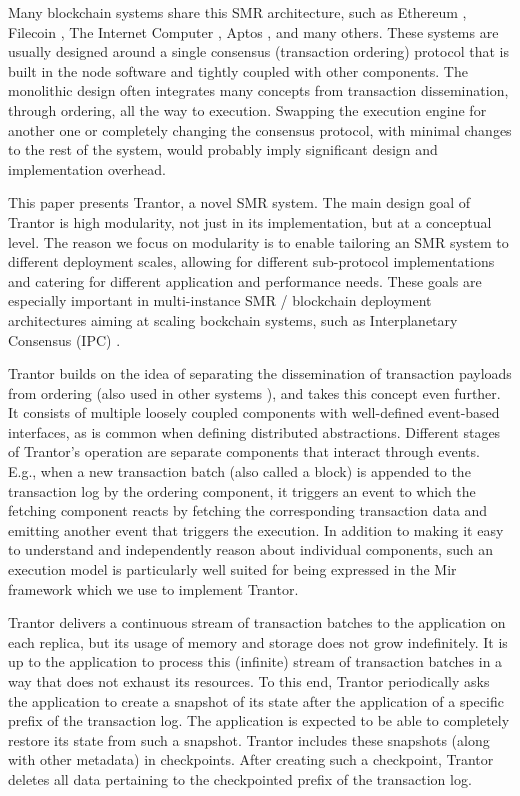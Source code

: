 \documentclass{article}
\begin{document}
Many blockchain systems share this SMR architecture, such as Ethereum \cite{ethereum}, Filecoin \cite{filecoin}, The Internet Computer \cite{dfinity}, Aptos \cite{aptos}, and many others.
These systems are usually designed around a single consensus (transaction ordering) protocol that is built in the node software and tightly coupled with other components.
The monolithic design often integrates many concepts from transaction dissemination, through ordering, all the way to execution.
Swapping the execution engine for another one or completely changing the consensus protocol,
with minimal changes to the rest of the system, would probably imply significant design and implementation overhead.

This paper presents Trantor, a novel SMR system.
The main design goal of Trantor is high modularity, not just in its implementation, but at a conceptual level.
The reason we focus on modularity is to enable tailoring an SMR system to different deployment scales,
allowing for different sub-protocol implementations and catering for different application and performance needs.
These goals are especially important in multi-instance SMR / blockchain deployment architectures aiming at scaling bockchain systems, such as Interplanetary Consensus (IPC) \cite{ipc}.

Trantor builds on the idea of separating the dissemination of transaction payloads from ordering
(also used in other systems \cite{modularblockchain,narwhal,bullshark}),
and takes this concept even further.
It consists of multiple loosely coupled components with well-defined event-based interfaces, as is common when defining distributed abstractions.
Different stages of Trantor’s operation are separate components that interact through events.
E.g., when a new transaction batch (also called a block) is appended to the transaction log by the ordering component,
it triggers an event to which the fetching component reacts by fetching the corresponding transaction data
and emitting another event that triggers the execution.
In addition to making it easy to understand and independently reason about individual components,
such an execution model is particularly well suited for being expressed in the Mir framework \cite{mir} which we use to implement Trantor.


Trantor delivers a continuous stream of transaction batches to the application on each replica,
but its usage of memory and storage does not grow indefinitely.
It is up to the application to process this (infinite) stream of transaction batches in a way that does not exhaust its resources.
To this end, Trantor periodically asks the application to create a snapshot of its state after the application of a specific prefix of the transaction log.
The application is expected to be able to completely restore its state from such a snapshot.
Trantor includes these snapshots (along with other metadata) in checkpoints.
After creating such a checkpoint, Trantor deletes all data pertaining to the checkpointed prefix of the transaction log.
\end{document}
